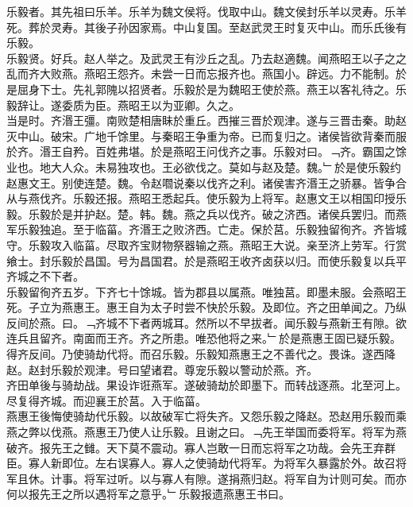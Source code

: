 \documentclass{zhvt-classic}
\begin{document}

\hspace*{2em}乐毅者。其先祖曰乐羊。乐羊为魏文侯将。伐取中山。魏文侯封乐羊以灵寿。乐羊死。葬於灵寿。其後子孙因家焉。中山复国。至赵武灵王时复灭中山。而乐氏後有乐毅。\\
\hspace*{2em}乐毅贤。好兵。赵人举之。及武灵王有沙丘之乱。乃去赵適魏。闻燕昭王以子之之乱而齐大败燕。燕昭王怨齐。未尝一日而忘报齐也。燕国小。辟远。力不能制。於是屈身下士。先礼郭隗以招贤者。乐毅於是为魏昭王使於燕。燕王以客礼待之。乐毅辞让。遂委质为臣。燕昭王以为亚卿。久之。\\
\hspace*{2em}当是时。齐湣王彊。南败楚相唐眛於重丘。西摧三晋於观津。遂与三晋击秦。助赵灭中山。破宋。广地千馀里。与秦昭王争重为帝。已而复归之。诸侯皆欲背秦而服於齐。湣王自矜。百姓弗堪。於是燕昭王问伐齐之事。乐毅对曰。﹁齐。霸国之馀业也。地大人众。未易独攻也。王必欲伐之。莫如与赵及楚。魏。﹂於是使乐毅约赵惠文王。别使连楚。魏。令赵嚪说秦以伐齐之利。诸侯害齐湣王之骄暴。皆争合从与燕伐齐。乐毅还报。燕昭王悉起兵。使乐毅为上将军。赵惠文王以相国印授乐毅。乐毅於是并护赵。楚。韩。魏。燕之兵以伐齐。破之济西。诸侯兵罢归。而燕军乐毅独追。至于临菑。齐湣王之败济西。亡走。保於莒。乐毅独留徇齐。齐皆城守。乐毅攻入临菑。尽取齐宝财物祭器输之燕。燕昭王大说。亲至济上劳军。行赏飨士。封乐毅於昌国。号为昌国君。於是燕昭王收齐卤获以归。而使乐毅复以兵平齐城之不下者。\\
\hspace*{2em}乐毅留徇齐五岁。下齐七十馀城。皆为郡县以属燕。唯独莒。即墨未服。会燕昭王死。子立为燕惠王。惠王自为太子时尝不快於乐毅。及即位。齐之田单闻之。乃纵反间於燕。曰。﹁齐城不下者两城耳。然所以不早拔者。闻乐毅与燕新王有隙。欲连兵且留齐。南面而王齐。齐之所患。唯恐他将之来。﹂於是燕惠王固已疑乐毅。得齐反间。乃使骑劫代将。而召乐毅。乐毅知燕惠王之不善代之。畏诛。遂西降赵。赵封乐毅於观津。号曰望诸君。尊宠乐毅以警动於燕。齐。\\
\hspace*{2em}齐田单後与骑劫战。果设诈诳燕军。遂破骑劫於即墨下。而转战逐燕。北至河上。尽复得齐城。而迎襄王於莒。入于临菑。\\
\hspace*{2em}燕惠王後悔使骑劫代乐毅。以故破军亡将失齐。又怨乐毅之降赵。恐赵用乐毅而乘燕之弊以伐燕。燕惠王乃使人让乐毅。且谢之曰。﹁先王举国而委将军。将军为燕破齐。报先王之雠。天下莫不震动。寡人岂敢一日而忘将军之功哉。会先王弃群臣。寡人新即位。左右误寡人。寡人之使骑劫代将军。为将军久暴露於外。故召将军且休。计事。将军过听。以与寡人有隙。遂捐燕归赵。将军自为计则可矣。而亦何以报先王之所以遇将军之意乎。﹂乐毅报遗燕惠王书曰。\\
\end{document}
